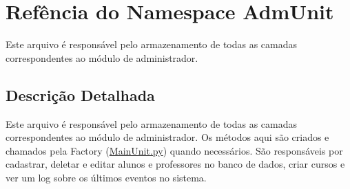 \hypertarget{namespaceAdmUnit}{\section{Refência do Namespace Adm\-Unit}
\label{namespaceAdmUnit}
}


Este arquivo é responsável pelo armazenamento de todas as camadas correspondentes ao módulo de administrador.  




\subsection{Descrição Detalhada}
Este arquivo é responsável pelo armazenamento de todas as camadas correspondentes ao módulo de administrador. Os métodos aqui são criados e chamados pela Factory (\hyperlink{MainUnit_8py}{Main\-Unit.\-py}) quando necessários. São responsáveis por cadastrar, deletar e editar alunos e professores no banco de dados, criar cursos e ver um log sobre os últimos eventos no sistema. 